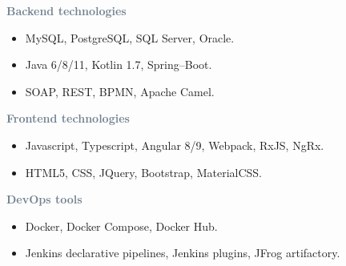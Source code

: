 



\textcolor{SlateGrey}{\textbf{Backend technologies}}
\newline

\begin{itemize}
    \item MySQL, PostgreSQL, SQL Server, Oracle.
    \item Java 6/8/11, Kotlin 1.7, Spring--Boot.
    \item SOAP, REST, BPMN, Apache Camel.
\end{itemize}

\textcolor{SlateGrey}{\textbf{Frontend technologies}}
\newline

\begin{itemize}
    \item Javascript, Typescript, Angular 8/9, Webpack, RxJS, NgRx.
    \item HTML5, CSS, JQuery, Bootstrap, MaterialCSS.
\end{itemize}

\textcolor{SlateGrey}{\textbf{DevOps tools}}
\newline

\begin{itemize}
    \item Docker, Docker Compose, Docker Hub.
    \item Jenkins declarative pipelines, Jenkins plugins, JFrog artifactory.
\end{itemize}




